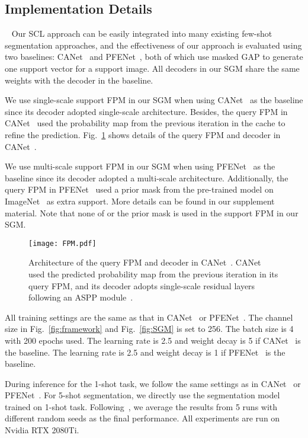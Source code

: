 \documentclass[final]{cvpr}
\begin{document}
\subsection{Implementation Details}~\label{sec:ID}
Our SCL approach can be easily integrated into many existing few-shot segmentation approaches, and the effectiveness of our approach is evaluated using two baselines: CANet~\cite{zhang2019canet} and PFENet~\cite{tian2020prior}, both of which use masked GAP to generate one support vector for a support image. All decoders in our SGM share the same weights with the decoder in the baseline.

We use single-scale support FPM in our SGM when using CANet~\cite{zhang2019canet} as the baseline since its decoder adopted  single-scale architecture. Besides, the query FPM in CANet~\cite{zhang2019canet} used the probability map  from the previous iteration in the cache to refine the prediction. Fig.~\ref{fig:FPM} shows details of the query FPM and decoder in CANet~\cite{zhang2019canet}.

We use multi-scale support FPM in our SGM when using PFENet~\cite{tian2020prior} as the baseline since its decoder adopted a multi-scale architecture. Additionally, the query FPM in PFENet~\cite{tian2020prior} used a prior mask from the pre-trained model on ImageNet~\cite{russakovsky2015imagenet} as extra support. More details can be found in our supplement material. Note that none of  or the prior mask is used in the support FPM in our SGM.

\begin{figure}
	\centering
	\texttt{[image: FPM.pdf]}
	\caption{Architecture of the query FPM and decoder in CANet~\cite{zhang2019canet}. CANet used the predicted probability map  from the previous iteration in its query FPM, and its decoder adopts single-scale residual layers following an ASPP module~\cite{chen2017rethinking}.}
	\label{fig:FPM}
\end{figure}

All training settings are the same as that in CANet~\cite{zhang2019canet} or PFENet~\cite{tian2020prior}. The channel size  in Fig.~\ref{fig:framework} and Fig.~\ref{fig:SGM} is set to 256. The batch size is 4 with 200 epochs used.  The learning rate is 2.5 and weight decay is 5 if CANet~\cite{zhang2019canet} is the baseline. The learning rate is 2.5 and weight decay is 1 if PFENet~\cite{tian2020prior} is the baseline.

During inference for the 1-shot task, we follow the same settings as in CANet~\cite{zhang2019canet} or PFENet~\cite{tian2020prior}.  
For 5-shot segmentation, we directly use the segmentation model trained on 1-shot task. Following~\cite{wang2019panet}, we average the results from 5 runs with different random seeds as the final performance. All experiments are run on Nvidia RTX 2080Ti.
\end{document}
